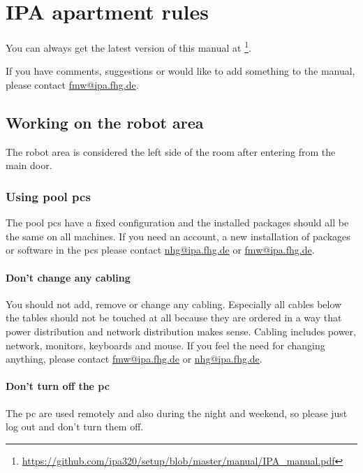 \chapter{IPA apartment rules}\label{chap:apartment-rules} 
You can always get the latest version of this manual at \footnote{\url{https://github.com/ipa320/setup/blob/master/manual/IPA_manual.pdf}}.

If you have comments, suggestions or would like to add something to the manual, please contact \href{mailto:fmw@ipa.fhg.de}{fmw@ipa.fhg.de}.

\section{Working on the robot area}
The robot area is considered the left side of the room after entering from the main door.

\subsection{Using pool pcs}
The pool pcs have a fixed configuration and the installed packages should all be the same on all machines. If you need an account, a new installation of packages or software in the pcs please contact \href{mailto:nhg@ipa.fhg.de}{nhg@ipa.fhg.de} or \href{mailto:fmw@ipa.fhg.de}{fmw@ipa.fhg.de}.

\subsubsection{Don't change any cabling}\label{sec:cabling}
You should not add, remove or change any cabling. Especially all cables below the tables should not be touched at all because they are ordered in a way that power distribution and network distribution makes sense. Cabling includes power, network, monitors, keyboards and mouse. If you feel the need for changing anything, please contact \href{mailto:fmw@ipa.fhg.de}{fmw@ipa.fhg.de} or \href{mailto:nhg@ipa.fhg.de}{nhg@ipa.fhg.de}.

\subsubsection{Don't turn off the pc}\label{sec:poolpcs}
The pc are used remotely and also during the night and weekend, so please just log out and don't turn them off.

